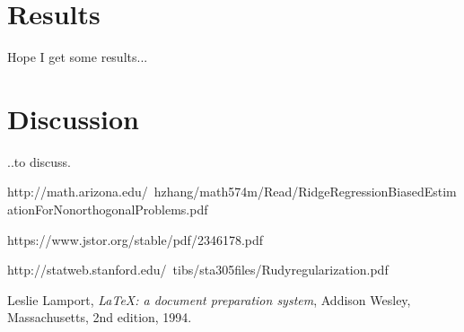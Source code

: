 \documentclass[a4paper,12pt, english]{article}
\begin{document}
\section*{Results}

Hope I get some results...

\section*{Discussion}

..to discuss. 

http://math.arizona.edu/~hzhang/math574m/Read/RidgeRegressionBiasedEstimationForNonorthogonalProblems.pdf

https://www.jstor.org/stable/pdf/2346178.pdf

http://statweb.stanford.edu/~tibs/sta305files/Rudyregularization.pdf

\begin{thebibliography}{9}

  Leslie Lamport,
  \textit{\LaTeX: a document preparation system},
  Addison Wesley, Massachusetts,
  2nd edition,
  1994.
  


\end{thebibliography}
\end{document}
